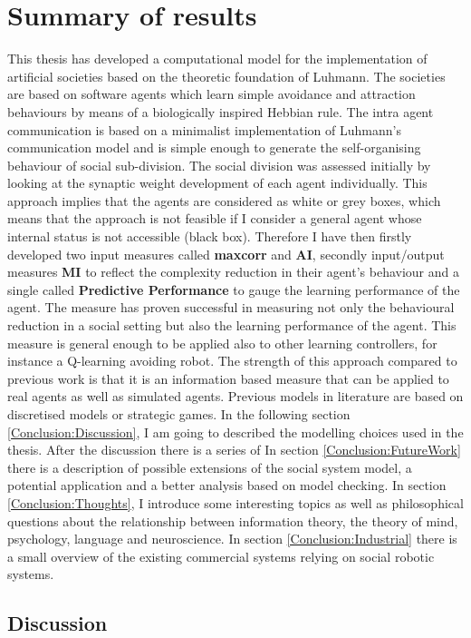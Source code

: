 \section{Summary of results}
This thesis has developed a computational model for the implementation
of artificial societies based on the theoretic foundation of Luhmann.
The societies are based on software agents which learn simple avoidance
and attraction behaviours by means of a biologically inspired Hebbian rule.
The intra agent communication is based on a minimalist implementation
of Luhmann's communication model and is simple enough to generate the self-organising
behaviour of social sub-division.
The social division was assessed initially by looking at the synaptic weight development
of each agent individually.
This approach implies that the agents are considered as white or grey boxes, which
means that the approach is not feasible if I consider a general agent whose
internal status is not accessible (black box).
Therefore I have then firstly developed two input measures called \textbf{maxcorr} and \textbf{AI},
secondly input/output measures \textbf{MI} to reflect the complexity reduction
in their agent's behaviour and a single called \textbf{Predictive Performance} to gauge the learning 
performance of the agent.
The measure has proven successful in measuring not only the behavioural reduction in
a social setting but also the learning performance of the agent.
This measure is general enough to be applied also to other learning controllers,
for instance a Q-learning avoiding robot.
The strength of this approach compared to previous work is that it is
an information based measure that can be applied to real agents
as well as simulated agents.
Previous models in literature are based on discretised models or strategic games.
In the following section \ref{Conclusion:Discussion}, I am going to described the
modelling choices used in the thesis.
After the discussion there is a series of 
In section \ref{Conclusion:FutureWork} there is a description of possible extensions 
of the social system model, a potential application and a better analysis based on
model checking.
In section \ref{Conclusion:Thoughts}, I introduce some interesting topics as well as philosophical
questions about the relationship between information theory, the theory of mind,
psychology, language and neuroscience.
In section \ref{Conclusion:Industrial} there is a small overview of the existing
commercial systems relying on social robotic systems.

\subsection{Discussion \label{Conclusion:Discussion}}

